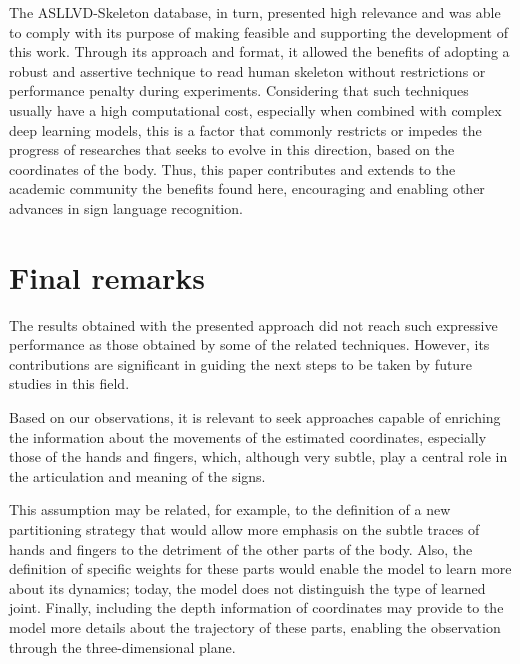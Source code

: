 The ASLLVD-Skeleton database, in turn, presented high relevance and was able to comply with its purpose of making feasible and supporting the development of this work.  Through its approach and format, it allowed the benefits of adopting a robust and assertive technique to read human skeleton without restrictions or performance penalty during experiments. Considering that such techniques usually have a high computational cost, especially when combined with complex deep learning models, this is a factor that commonly restricts or impedes the progress of researches that seeks to evolve in this direction, based on the coordinates of the body. Thus, this paper contributes and extends to the academic community the benefits found here, encouraging and enabling other advances in sign language recognition.


\section{Final remarks} 
\label{sec:final-remarks}

The results obtained with the presented approach did not reach such expressive performance as those obtained by some of the related techniques. However, its contributions are significant in guiding the next steps to be taken by future studies in this field.

Based on our observations, it is relevant to seek approaches capable of enriching the information about the movements of the estimated coordinates, especially those of the hands and fingers, which, although very subtle, play a central role in the articulation and meaning of the signs.

This assumption may be related, for example, to the definition of a new partitioning strategy that would allow more emphasis on the subtle traces of hands and fingers to the detriment of the other parts of the body. Also, the definition of specific weights for these parts would enable the model to learn more about its dynamics; today, the model does not distinguish the type of learned joint. Finally, including the depth information of coordinates may provide to the model more details about the trajectory of these parts, enabling the observation through the three-dimensional plane.